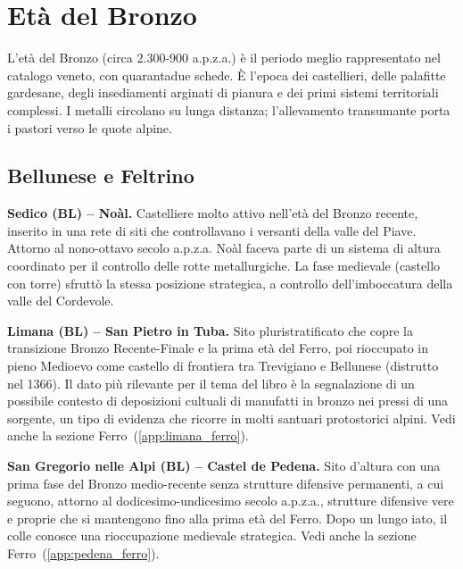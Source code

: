 \section{Età del Bronzo}
\label{app:bronzo}

L'età del Bronzo (circa 2.300-900 a.p.z.a.) è il periodo meglio rappresentato nel catalogo veneto, con quarantadue schede. È l'epoca dei castellieri, delle palafitte gardesane, degli insediamenti arginati di pianura e dei primi sistemi territoriali complessi. I metalli circolano su lunga distanza; l'allevamento transumante porta i pastori verso le quote alpine.

\subsection{Bellunese e Feltrino}

\textbf{Sedico (BL) -- Noàl.} \label{app:sedico} Castelliere molto attivo nell'età del Bronzo recente, inserito in una rete di siti che controllavano i versanti della valle del Piave. Attorno al nono-ottavo secolo a.p.z.a. Noàl faceva parte di un sistema di altura coordinato per il controllo delle rotte metallurgiche. La fase medievale (castello con torre) sfruttò la stessa posizione strategica, a controllo dell'imboccatura della valle del Cordevole.

\textbf{Limana (BL) -- San Pietro in Tuba.} \label{app:limana} Sito pluristratificato che copre la transizione Bronzo Recente-Finale e la prima età del Ferro, poi rioccupato in pieno Medioevo come castello di frontiera tra Trevigiano e Bellunese (distrutto nel 1366). Il dato più rilevante per il tema del libro è la segnalazione di un possibile contesto di deposizioni cultuali di manufatti in bronzo nei pressi di una sorgente, un tipo di evidenza che ricorre in molti santuari protostorici alpini. Vedi anche la sezione Ferro~(\ref{app:limana_ferro}).

\textbf{San Gregorio nelle Alpi (BL) -- Castel de Pedena.} \label{app:pedena} Sito d'altura con una prima fase del Bronzo medio-recente senza strutture difensive permanenti, a cui seguono, attorno al dodicesimo-undicesimo secolo a.p.z.a., strutture difensive vere e proprie che si mantengono fino alla prima età del Ferro. Dopo un lungo iato, il colle conosce una rioccupazione medievale strategica. Vedi anche la sezione Ferro~(\ref{app:pedena_ferro}).

